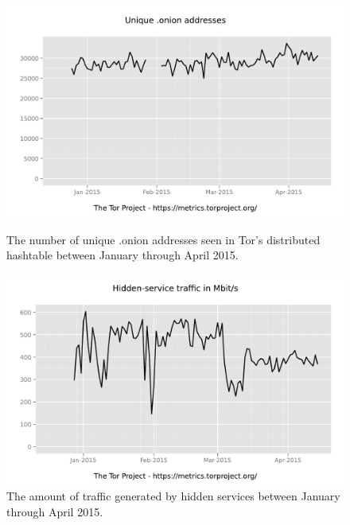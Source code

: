 \begin{figure}[htdp]
	\begin{minipage}[b]{0.48\linewidth}
		\centering
		\includegraphics[width=\textwidth]{images/Tor/onion_2014-10_2015-04.pdf}
		\caption{The number of unique .onion addresses seen in Tor's distributed hashtable between January through April 2015\cite{TorMetrics}\cite{kadianakis2015extrapolating}.}
	\end{minipage}
	\hspace{0.5cm}
	\begin{minipage}[b]{0.48\linewidth}
		\centering
		\includegraphics[width=\textwidth]{images/Tor/onionbw_2014-11_2015-04.pdf}
		\caption{The amount of traffic generated by hidden services between January through April 2015\cite{TorMetrics}\cite{kadianakis2015extrapolating}.}
	\end{minipage}
\end{figure}

\newpage

